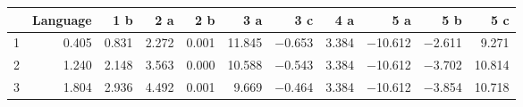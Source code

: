 \begin{tabular}{rrrrrrrrrrr}
\toprule
    &   Language &   1 b &   2 a &   2 b &    3 a &    3 c &   4 a &     5 a &    5 b &    5 c \\
\midrule
  1 &      \num{0.405} & \num{0.831} & \num{2.272} & \num{0.001} & \num{11.845} & \num{-0.653} & \num{3.384} & \num{-10.612} & \num{-2.611} &  \num{9.271} \\
  2 &      \num{1.240} & \num{2.148} & \num{3.563} & \num{0.000} & \num{10.588} & \num{-0.543} & \num{3.384} & \num{-10.612} & \num{-3.702} & \num{10.814} \\
  3 &      \num{1.804} & \num{2.936} & \num{4.492} & \num{0.001} &  \num{9.669} & \num{-0.464} & \num{3.384} & \num{-10.612} & \num{-3.854} & \num{10.718} \\
\bottomrule
\end{tabular}